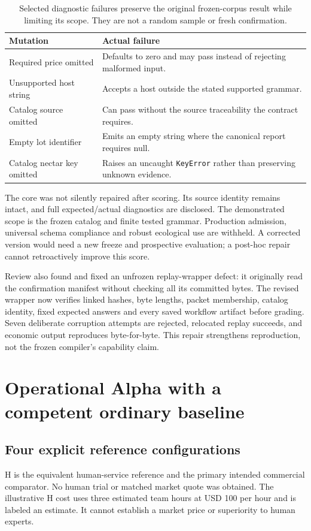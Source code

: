 \documentclass[11pt]{article}
\begin{document}
\begin{table}[H]
\small
\begin{tabularx}{\textwidth}{@{}p{41mm}Y@{}}
\toprule
Mutation & Actual failure\\\midrule
Required price omitted & Defaults to zero and may pass instead of rejecting malformed input.\\
Unsupported host string & Accepts a host outside the stated supported grammar.\\
Catalog source omitted & Can pass without the source traceability the contract requires.\\
Empty lot identifier & Emits an empty string where the canonical report requires null.\\
Catalog nectar key omitted & Raises an uncaught \texttt{KeyError} rather than preserving unknown evidence.\\
\bottomrule
\end{tabularx}
\caption{Selected diagnostic failures preserve the original frozen-corpus result while limiting its scope. They are not a random sample or fresh confirmation.}
\end{table}

The core was not silently repaired after scoring. Its source identity remains intact, and full expected/actual diagnostics are disclosed. The demonstrated scope is the frozen catalog and finite tested grammar. Production admission, universal schema compliance and robust ecological use are withheld. A corrected version would need a new freeze and prospective evaluation; a post-hoc repair cannot retroactively improve this score.

Review also found and fixed an unfrozen replay-wrapper defect: it originally read the confirmation manifest without checking all its committed bytes. The revised wrapper now verifies linked hashes, byte lengths, packet membership, catalog identity, fixed expected answers and every saved workflow artifact before grading. Seven deliberate corruption attempts are rejected, relocated replay succeeds, and economic output reproduces byte-for-byte. This repair strengthens reproduction, not the frozen compiler's capability claim.

\section{Operational Alpha with a competent ordinary baseline}
\subsection{Four explicit reference configurations}
H is the equivalent human-service reference and the primary intended commercial comparator. No human trial or matched market quote was obtained. The illustrative H cost uses three estimated team hours at USD 100 per hour and is labeled an estimate. It cannot establish a market price or superiority to human experts.
\end{document}
